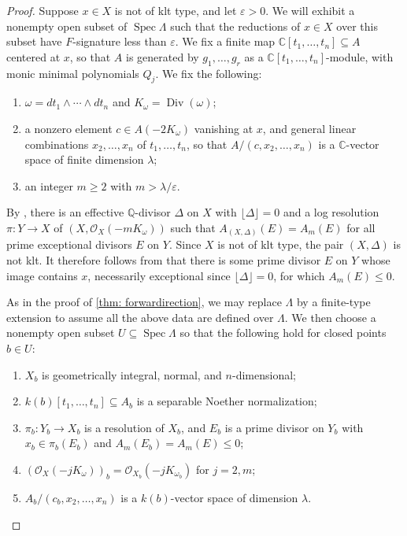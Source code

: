 \documentclass[11pt,leqno]{amsart}
\numberwithin{equation}{section}
\theoremstyle{definition}
\theoremstyle{remark}
\renewcommand{\O}{\mathcal{O}}
\newcommand{\C}{\mathbb{C}}
\newcommand{\Q}{\mathbb{Q}}
\newcommand{\vare}{\varepsilon}
\newcommand{\Spec}{\operatorname{Spec}}
\newcommand{\Div}{\operatorname{Div}}
\begin{document}
\begin{proof}
Suppose $x \in X$ is not of klt type, and let $\vare > 0$. We will exhibit a nonempty open subset of $\Spec \Lambda$ such that the reductions of $x \in X$ over this subset have $F$-signature less than $\vare$. We fix a finite map $\C[t_1, \dots, t_n] \subseteq A$ centered at $x$, so that $A$ is generated by $g_1, \dots, g_r$ as a $\C[t_1, \dots, t_n]$-module, with monic minimal polynomials $Q_j$. We fix the following: \begin{enumerate}
    \item $\omega = dt_1 \wedge \cdots \wedge dt_n$ and $K_\omega = \Div(\omega)$;
    \item a nonzero element $c \in A(-2K_\omega)$ vanishing at $x$, and general linear combinations $x_2, \dots, x_n$ of $t_1, \dots, t_n$, so that $A/(c, x_2, \dots, x_n)$ is a $\C$-vector space of finite dimension $\lambda$;
    \item an integer $m \geq 2$ with $m > \lambda/\varepsilon$.
\end{enumerate}


By \cite[Theorem 5.4]{dFH09}, there is an effective $\Q$-divisor $\Delta$ on $X$ with $\lfloor \Delta \rfloor = 0$ and a log resolution $\pi: Y \to X$ of $(X, \O_X(-mK_\omega))$ such that $A_{(X, \Delta)}(E) = A_{m}(E)$ for all prime exceptional divisors $E$ on $Y$. Since $X$ is not of klt type, the pair $(X, \Delta)$ is not klt. It therefore follows from \cite[Corollary 2.32]{kollarmori} that there is some prime divisor $E$ on $Y$ whose image contains $x$, necessarily exceptional since $\lfloor \Delta \rfloor = 0$, for which $A_m(E) \leq 0$.


 As in the proof of \cref{thm: forwardirection}, we may replace $\Lambda$ by a finite-type extension to assume all the above data are defined over $\Lambda$. We then choose a nonempty open subset $U \subseteq \Spec \Lambda$ so that the following hold for closed points $b \in U$:
\begin{enumerate}[ref=(\arabic*)]
    \item\label{cond: convnormal} $X_b$ is geometrically integral, normal, and $n$-dimensional;
    \item\label{cond: convnoether} $k(b)[t_1, \dots, t_n] \subseteq A_b$ is a separable Noether normalization;
    \item\label{cond: convres} $\pi_b: Y_b \to X_b$ is a resolution of $X_b$, and $E_b$ is a prime divisor on $Y_b$ with $x_b \in \pi_b(E_b)$ and $A_m(E_b) = A_m(E) \leq 0$;
    \item\label{cond: convsheaves} $(\O_{X}(-jK_\omega))_b = \O_{X_b}(-jK_{\omega_b})$ for $j = 2, m$;
    \item\label{cond: convlength} $A_b/(c_b, x_2, \dots, x_n)$ is a $k(b)$-vector space of dimension $\lambda$.
\end{enumerate}



\end{proof}
\end{document}
